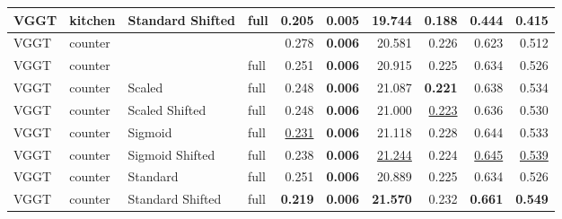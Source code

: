 \begin{table}[H]
\begin{tabular}{llllrrrrrr}
VGGT & kitchen & Standard Shifted & full & 0.205 & \textbf{0.005} & 19.744 & 0.188 & 0.444 & 0.415 \\
\midrule
VGGT & counter &  &  & 0.278 & \textbf{0.006} & 20.581 & 0.226 & 0.623 & 0.512 \\
VGGT & counter &  & full & 0.251 & \textbf{0.006} & 20.915 & 0.225 & 0.634 & 0.526 \\
VGGT & counter & Scaled & full & 0.248 & \textbf{0.006} & 21.087 & \textbf{0.221} & 0.638 & 0.534 \\
VGGT & counter & Scaled Shifted & full & 0.248 & \textbf{0.006} & 21.000 & \underline{0.223} & 0.636 & 0.530 \\
VGGT & counter & Sigmoid & full & \underline{0.231} & \textbf{0.006} & 21.118 & 0.228 & 0.644 & 0.533 \\
VGGT & counter & Sigmoid Shifted & full & 0.238 & \textbf{0.006} & \underline{21.244} & 0.224 & \underline{0.645} & \underline{0.539} \\
VGGT & counter & Standard & full & 0.251 & \textbf{0.006} & 20.889 & 0.225 & 0.634 & 0.526 \\
VGGT & counter & Standard Shifted & full & \textbf{0.219} & \textbf{0.006} & \textbf{21.570} & 0.232 & \textbf{0.661} & \textbf{0.549} \\
\bottomrule
\end{tabular}
\end{table}